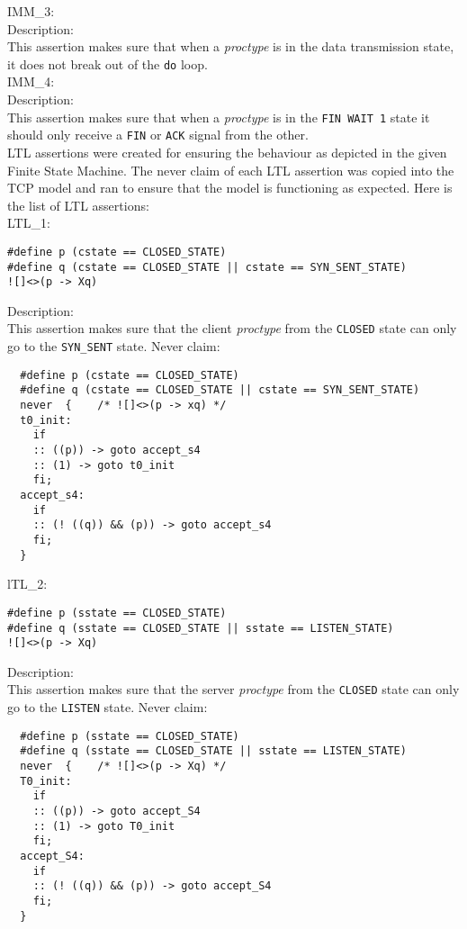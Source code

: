 \documentclass{WigReport}
\begin{document}
IMM\_3:\\
Description:\\
This assertion makes sure that when a \textit{proctype} is in the data transmission state, it does not break out of the \verb|do| loop.
\\

IMM\_4:\\
Description:\\
This assertion makes sure that when a \textit{proctype} is in the \verb|FIN WAIT 1| state it should only receive a \verb|FIN| or \verb|ACK| signal from the other.
\\

LTL assertions were created for ensuring the behaviour as depicted in the given Finite State Machine. The never claim of each LTL assertion was copied into the TCP model and ran to ensure that the model is functioning as expected. Here is the list of LTL assertions:
\\

LTL\_1:\\
\begin{lstlisting}
#define p (cstate == CLOSED_STATE)
#define q (cstate == CLOSED_STATE || cstate == SYN_SENT_STATE)
![]<>(p -> Xq)
\end{lstlisting}
Description:\\
This assertion makes sure that the client \textit{proctype} from the \verb|CLOSED| state can only go to the \verb|SYN_SENT| state.
Never claim:\\
\begin{lstlisting}
  #define p (cstate == CLOSED_STATE)
  #define q (cstate == CLOSED_STATE || cstate == SYN_SENT_STATE)
  never  {    /* ![]<>(p -> xq) */
  t0_init:
    if
    :: ((p)) -> goto accept_s4
    :: (1) -> goto t0_init
    fi;
  accept_s4:
    if
    :: (! ((q)) && (p)) -> goto accept_s4
    fi;
  }
\end{lstlisting}

lTL\_2:\\
\begin{lstlisting}
#define p (sstate == CLOSED_STATE)
#define q (sstate == CLOSED_STATE || sstate == LISTEN_STATE)
![]<>(p -> Xq)
\end{lstlisting}
Description:\\
This assertion makes sure that the server \textit{proctype} from the
\verb|CLOSED| state can only go to the \verb|LISTEN| state.
Never claim:\\
\begin{lstlisting}
  #define p (sstate == CLOSED_STATE)
  #define q (sstate == CLOSED_STATE || sstate == LISTEN_STATE)
  never  {    /* ![]<>(p -> Xq) */
  T0_init:
    if
    :: ((p)) -> goto accept_S4
    :: (1) -> goto T0_init
    fi;
  accept_S4:
    if
    :: (! ((q)) && (p)) -> goto accept_S4
    fi;
  }
\end{lstlisting}
\end{document}
